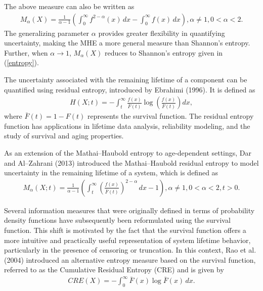 \documentclass[11pt,reqno]{amsart}
\theoremstyle{tight}
\begin{document}
 The above measure can also be written as
 \begin{align}\label{reMHE}
M_\alpha(X)= \frac{1}{\alpha-1}\left({\int_0^\infty} f^{2-\alpha}(x)\,dx  - {\int_0^\infty}f(x) \, dx\right), \alpha \neq 1, 0<\alpha<2.
 \end{align}
The generalizing parameter $\alpha$ provides greater flexibility in quantifying uncertainty, making the MHE a more general measure than Shannon’s entropy.
 Further, when $\alpha \to 1$, $M_\alpha(X)$  reduces to Shannon’s entropy given in (\ref{entropy}).

 \par The uncertainty associated with the remaining lifetime of a component can be quantified using residual entropy, introduced by Ebrahimi (1996). It is defined as
\begin{align}\label{residual entropy}
H(X;t) = -\int_{t}^{\infty} \frac{f(x)}{\bar{F}(t)}
\log\!\left( \frac{f(x)}{\bar{F}(t)} \right) dx,
\end{align}
where $\bar{F}(t) = 1 - F(t)$ represents the survival function. The residual entropy function has applications in lifetime data analysis, reliability modeling, and the study of survival and aging properties.

\par As an extension of the Mathai--Haubold entropy to age-dependent settings, Dar and Al--Zahrani (2013) introduced the Mathai--Haubold residual entropy to model uncertainty in the remaining lifetime of a system, which is defined as
\begin{align}
 M_\alpha(X;t)= \frac{1}{\alpha-1}\left( {\int_t^\infty} \left(\frac{{f}(x)}{\bar{F}(t)}\right)^{2-\alpha} \,dx -1\right), \alpha \neq 1, 0<\alpha<2,t>0.
\end{align}
\par Several information measures that were originally defined in terms of probability density functions have subsequently been reformulated using the survival function. This shift is motivated by the fact that the survival function offers a more intuitive and practically useful representation of system lifetime behavior, particularly in the presence of censoring or truncation. In this context, Rao et al. (2004) introduced an alternative entropy measure based on the survival function, referred to as the Cumulative Residual Entropy (CRE) and is given by
\begin{align}\label{CRE}
     CRE(X)=-\int_{0}^{\infty} \bar{F}(x) \log \bar{F}(x) \,dx.
\end{align}
\end{document}
